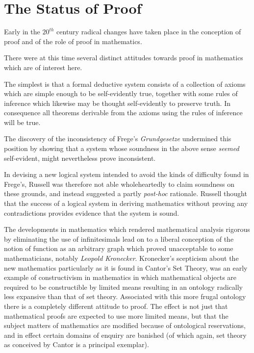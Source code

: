 \section{The Status of Proof}

Early in the $20^{th}$ century radical changes have taken place in the
conception of proof and of the role of proof in mathematics.

There were at this time several distinct attitudes towards proof in
mathematics which are of interest here.

The simplest is that a formal deductive system consists of a
collection of axioms which are simple enough to be self-evidently
true, together with some rules of inference which likewise may be
thought self-evidently to preserve truth.
In consequence all theorems derivable from the axioms using the rules
of inference will be true.

The discovery of the inconsistency of Frege's \emph{Grundgesetze}
undermined this position by showing that a system whose soundness in
the above sense \emph{seemed} self-evident, might nevertheless prove
inconsistent.

In devising a new logical system intended to avoid the kinds of
difficulty found in Frege's, Russell was therefore not able
wholeheartedly to claim soundness on these grounds, and instead
suggested a partly \emph{post-hoc} rationale.
Russell thought that the success of a logical system in deriving
mathematics without proving any contradictions provides evidence that
the system is sound.

The developments in mathematics which rendered mathematical analysis
rigorous by eliminating the use of infinitesimals lead on to a liberal
conception of the notion of function as an arbitrary graph which
proved unacceptable to some mathematicians, notably \emph{Leopold
  Kronecker}.
Kronecker's scepticism about the new mathematics particularly as it is
found in Cantor's Set Theory, was an early example of constructivism
in mathematics in which mathematical objects are required to be
constructible by limited means resulting in an ontology radically less
expansive than that of set theory.
Associated with this more frugal ontology there is a completely
different attitude to proof.
The effect is not just that mathematical proofs are expected to use
more limited means, but that the subject matters of mathematics are
modified because of ontological reservations, and in effect certain
domains of enquiry are banished (of which again, set theory as
conceived by Cantor is a principal exemplar).


